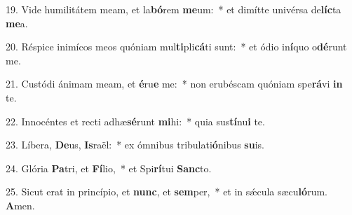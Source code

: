 19. Vide humilitátem meam, et la\textbf{bó}rem \textbf{me}um:~*  et dimítte univérsa de\textbf{líc}ta \textbf{me}a.\

20. Réspice inimícos meos quóniam mul\textbf{ti}pli\textbf{cá}ti sunt:~*  et ódio in\textbf{í}quo o\textbf{dé}runt me.\

21. Custódi ánimam meam, et \textbf{é}ru\textbf{e} me:~*  non erubéscam quóniam spe\textbf{rá}vi \textbf{in} te.\

22. Innocéntes et recti adhæ\textbf{sé}runt \textbf{mi}hi:~*  quia sus\textbf{tí}nu\textbf{i} te.\

23. Líbera, \textbf{De}us, \textbf{Is}raël:~*  ex ómnibus tribulati\textbf{ó}nibus \textbf{su}is.\

24. Glória \textbf{Pa}tri, et \textbf{Fí}lio,~*  et Spi\textbf{rí}tui \textbf{Sanc}to.\

25. Sicut erat in princípio, et \textbf{nunc}, et \textbf{sem}per,~*  et in sǽcula sæcu\textbf{ló}rum. \textbf{A}men.\

